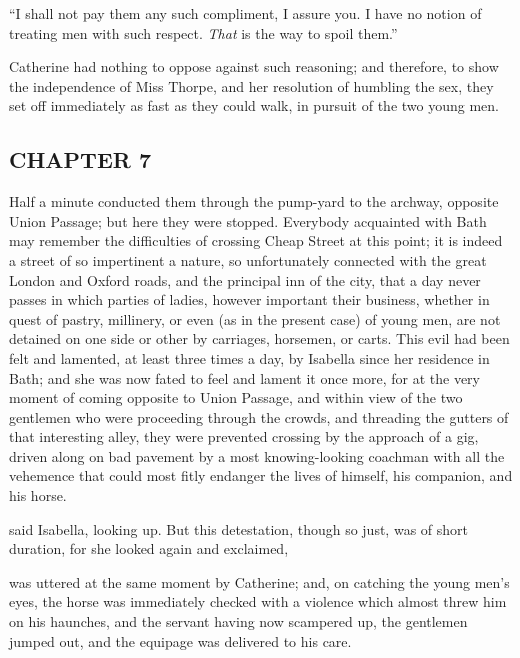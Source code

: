 
“I shall not pay them any such compliment, I assure you. I have no notion of treating men with such respect. {\em That} is the way to spoil them.”

Catherine had nothing to oppose against such reasoning; and therefore, to show the independence of Miss Thorpe, and her resolution of humbling the sex, they set off immediately as fast as they could walk, in pursuit of the two young men.

\subsection[chapter-7]{\useURL[url9][][][]\from[url9]CHAPTER 7}

Half a minute conducted them through the pump-yard to the archway, opposite Union Passage; but here they were stopped. Everybody acquainted with Bath may remember the difficulties of crossing Cheap Street at this point; it is indeed a street of so impertinent a nature, so unfortunately connected with the great London and Oxford roads, and the principal inn of the city, that a day never passes in which parties of ladies, however important their business, whether in quest of pastry, millinery, or even (as in the present case) of young men, are not detained on one side or other by carriages, horsemen, or carts. This evil had been felt and lamented, at least three times a day, by Isabella since her residence in Bath; and she was now fated to feel and lament it once more, for at the very moment of coming opposite to Union Passage, and within view of the two gentlemen who were proceeding through the crowds, and threading the gutters of that interesting alley, they were prevented crossing by the approach of a gig, driven along on bad pavement by a most knowing-looking coachman with all the vehemence that could most fitly endanger the lives of himself, his companion, and his horse.

 said Isabella, looking up.  But this detestation, though so just, was of short duration, for she looked again and exclaimed, 

 was uttered at the same moment by Catherine; and, on catching the young men's eyes, the horse was immediately checked with a violence which almost threw him on his haunches, and the servant having now scampered up, the gentlemen jumped out, and the equipage was delivered to his care.

